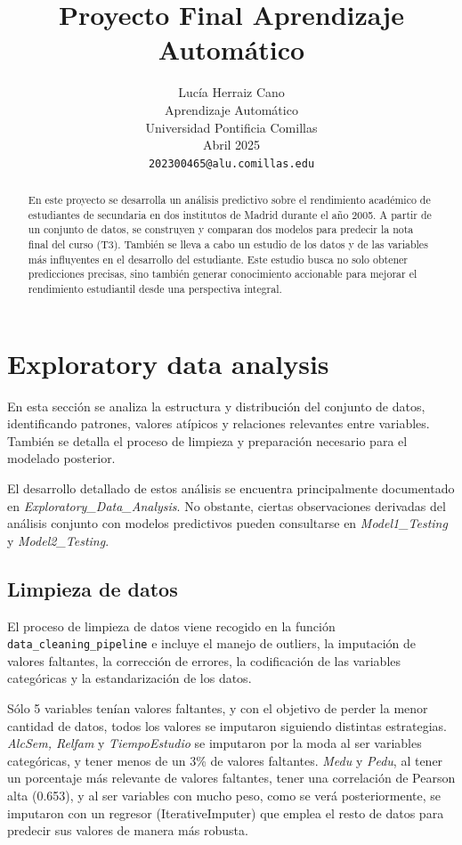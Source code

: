 \documentclass{article}
\title{Proyecto Final Aprendizaje Automático}
\author{%
    Lucía Herraiz Cano\\
    Aprendizaje Automático\\
    Universidad Pontificia Comillas\\
    Abril 2025\\
    \texttt{202300465@alu.comillas.edu} \\
}
\begin{document}
\maketitle


\begin{abstract}
  En este proyecto se desarrolla un análisis predictivo sobre el rendimiento 
  académico de estudiantes de secundaria en dos institutos de Madrid durante 
  el año 2005. A partir de un conjunto de datos, se construyen y comparan dos 
  modelos para predecir la nota final del curso (T3). También se lleva a cabo 
  un estudio de los datos y de las variables más influyentes en el desarrollo
  del estudiante. Este estudio busca no solo obtener predicciones precisas, 
  sino también generar conocimiento accionable para mejorar el rendimiento 
  estudiantil desde una perspectiva integral.
\end{abstract}


\section{Exploratory data analysis}


En esta sección se analiza la estructura y distribución del conjunto de datos, identificando patrones, valores atípicos y relaciones relevantes entre variables. También se detalla el proceso de limpieza y preparación necesario para el modelado posterior.

El desarrollo detallado de estos análisis se encuentra principalmente documentado en \textit{Exploratory\_Data\_Analysis}. No obstante, ciertas observaciones derivadas del análisis 
conjunto con modelos predictivos pueden consultarse en \textit{Model1\_Testing} y \textit{Model2\_Testing}.


\subsection{Limpieza de datos}


El proceso de limpieza de datos viene recogido en la función \texttt{data\_cleaning\_pipeline}
e incluye el manejo de outliers, la imputación de valores faltantes, la corrección de errores, la codificación de las variables 
categóricas y la estandarización de los datos.

Sólo 5 variables tenían valores faltantes, y con el objetivo de perder la menor cantidad de datos, todos los valores se imputaron siguiendo distintas estrategias.
\textit{AlcSem, Relfam} y \textit{TiempoEstudio} se imputaron por la moda al ser variables categóricas, y tener menos de un 3\% de valores faltantes. \textit{Medu} y \textit{Pedu}, 
al tener un porcentaje más relevante de valores faltantes, tener una correlación de Pearson alta (0.653), y al ser variables con mucho peso, como se verá posteriormente, se imputaron con un regresor (IterativeImputer) que emplea el resto de datos
para predecir sus valores de manera más robusta. 
\end{document}

